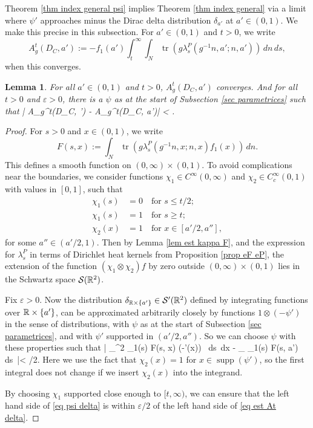 \documentclass[11pt]{article}
\theoremstyle{plain}
\newtheorem{lemma}[theorem]{Lemma}
\theoremstyle{definition}
\theoremstyle{remark}
\numberwithin{equation}{section}
\DeclareMathOperator{\tr}{tr}
\DeclareMathOperator{\supp}{supp}
\begin{document}
Theorem \ref{thm index general psi} implies Theorem \ref{thm index general} via a limit where $\psi'$ approaches minus the Dirac delta distribution $\delta_{a'}$ at $a' \in (0,1)$. We make this precise in this subsection.
For $a' \in (0,1)$ and $t>0$, we write
\[
A_g^t(D_C, a') := - f_1(a')\int_t^{\infty} \int_N \tr(g \lambda_s^P(g^{-1}n, a'; n, a'))\, dn\, ds,
\]
when this converges.
\begin{lemma}\label{lem psi delta}
For all  $a' \in (0,1)$ and $t>0$, $A_g^t(D_C, a')$ converges. And for all $t>0$ and $\varepsilon>0$,  there is a $\psi$ as at the start of Subsection \ref{sec parametrices} such that
\left| A_g^t(D_C, \psi') -  A_g^t(D_C, a')\right| < \varepsilon.
\eeq
\end{lemma}
\begin{proof}
For $s>0$ and $x\in  (0,1)$, we write
\[
F(s, x) := \int_N \tr(g \lambda_s^P(g^{-1}n, x; n, x)f_1(x))\, dn.
\]
This defines a smooth function on $(0, \infty) \times (0,1)$. To avoid complications near the boundaries, we consider functions $\chi_1 \in C^{\infty}(0, \infty)$ and $\chi_2 \in C^{\infty}_c(0,1)$  with values in $[0, 1]$, such that
\[
\begin{split}
\chi_1(s) &= 0 \quad  \text {for $s \leq t/2$};\\
\chi_1(s) &= 1\quad \text {for $s \geq t$};\\
\chi_2(x) &= 1\quad \text {for $x  \in [a'/2, a'']$},
\end{split}
\]
for some $a'' \in (a'/2, 1)$.
Then by Lemma \ref{lem est kappa F}, and the expression for $\lambda_s^P$ in terms of Dirichlet heat kernels from Proposition \ref{prop eF eP},
 the extension of the function $(\chi_1 \otimes \chi_2)f$  by zero outside $(0, \infty) \times (0,1)$ lies in the Schwartz space $\mathcal{S}(\mathbb{R}^2)$.

Fix $\varepsilon>0$.
Now the distribution $\delta_{\mathbb{R} \times \{a'\}} \in \mathcal{S}'(\mathbb{R}^2)$ defined by integrating functions over $\mathbb{R} \times \{a'\}$, can be approximated arbitrarily closely by functions $1 \otimes (-\psi')$ in the sense of distributions, with $\psi$ as at the start of Subsection \ref{sec parametrices}, and with $\psi'$ supported in $(a'/2,a'')$. So we can choose $\psi$ with these properties such that
\left|  \int_{\R^2} \chi_1(s)  F(s, x) (-\psi'(x)) \, ds\, dx - \int_{\R} \chi_1(s) F(s, a')  \, ds\, \right|< \varepsilon/2.
\eeq
Here we use the fact that $\chi_2(x) = 1$  for $x \in \supp(\psi')$, so the first  integral does not change if we insert $\chi_2(x)$  into the integrand.

By choosing $\chi_1$ supported close enough to $[t, \infty)$, we can ensure that the left hand side of \eqref{eq psi delta} is within $\varepsilon/2$ of the left hand side of \eqref{eq est At delta}.
\end{proof}
\end{document}

